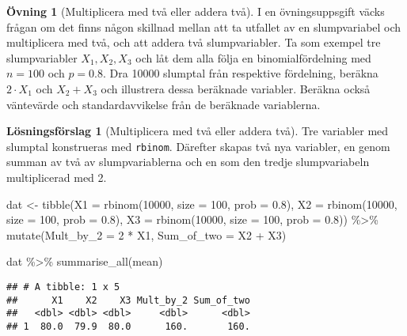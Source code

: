 \documentclass[
]{book}
\newenvironment{Shaded}{\begin{snugshade}}{\end{snugshade}}
\newcommand{\AttributeTok}[1]{\textcolor[rgb]{0.77,0.63,0.00}{#1}}
\newcommand{\DecValTok}[1]{\textcolor[rgb]{0.00,0.00,0.81}{#1}}
\newcommand{\FloatTok}[1]{\textcolor[rgb]{0.00,0.00,0.81}{#1}}
\newcommand{\FunctionTok}[1]{\textcolor[rgb]{0.00,0.00,0.00}{#1}}
\newcommand{\NormalTok}[1]{#1}
\newcommand{\OtherTok}[1]{\textcolor[rgb]{0.56,0.35,0.01}{#1}}
\newcommand{\SpecialCharTok}[1]{\textcolor[rgb]{0.00,0.00,0.00}{#1}}
\theoremstyle{definition}
\theoremstyle{definition}
\theoremstyle{definition}
\newtheorem{exercise}{Övning}[chapter]
\theoremstyle{definition}
\newtheorem{hypothesis}{Lösningsförslag}[chapter]
\theoremstyle{remark}
\begin{document}
\begin{exercise}[Multiplicera med två eller addera två]
I en övningsuppsgift väcks frågan om det finns någon skillnad mellan att ta utfallet av en slumpvariabel och multiplicera med två, och att addera två slumpvariabler. Ta som exempel tre slumpvariabler \(X_1, X_2, X_3\) och låt dem alla följa en binomialfördelning med \(n = 100\) och \(p = 0.8\). Dra 10000 slumptal från respektive fördelning, beräkna \(2 \cdot X_1\) och \(X_2 + X_3\) och illustrera dessa beräknade variabler. Beräkna också väntevärde och standardavvikelse från de beräknade variablerna.
\end{exercise}

\begin{hypothesis}[Multiplicera med två eller addera två]
Tre variabler med slumptal konstrueras med \texttt{rbinom}. Därefter skapas två nya variabler, en genom summan av två av slumpvariablerna och en som den tredje slumpvariabeln multiplicerad med 2.

\begin{Shaded}
\begin{Highlighting}[]
\NormalTok{dat }\OtherTok{\textless{}{-}} \FunctionTok{tibble}\NormalTok{(}\AttributeTok{X1 =} \FunctionTok{rbinom}\NormalTok{(}\DecValTok{10000}\NormalTok{, }\AttributeTok{size =} \DecValTok{100}\NormalTok{, }\AttributeTok{prob =} \FloatTok{0.8}\NormalTok{),}
              \AttributeTok{X2 =} \FunctionTok{rbinom}\NormalTok{(}\DecValTok{10000}\NormalTok{, }\AttributeTok{size =} \DecValTok{100}\NormalTok{, }\AttributeTok{prob =} \FloatTok{0.8}\NormalTok{),}
              \AttributeTok{X3 =} \FunctionTok{rbinom}\NormalTok{(}\DecValTok{10000}\NormalTok{, }\AttributeTok{size =} \DecValTok{100}\NormalTok{, }\AttributeTok{prob =} \FloatTok{0.8}\NormalTok{)) }\SpecialCharTok{\%\textgreater{}\%} 
  \FunctionTok{mutate}\NormalTok{(}\AttributeTok{Mult\_by\_2 =} \DecValTok{2} \SpecialCharTok{*}\NormalTok{ X1,}
         \AttributeTok{Sum\_of\_two =}\NormalTok{ X2 }\SpecialCharTok{+}\NormalTok{ X3)}

\NormalTok{dat }\SpecialCharTok{\%\textgreater{}\%} 
  \FunctionTok{summarise\_all}\NormalTok{(mean)}
\end{Highlighting}
\end{Shaded}

\begin{verbatim}
## # A tibble: 1 x 5
##      X1    X2    X3 Mult_by_2 Sum_of_two
##   <dbl> <dbl> <dbl>     <dbl>      <dbl>
## 1  80.0  79.9  80.0      160.       160.
\end{verbatim}


\end{hypothesis}
\end{document}
